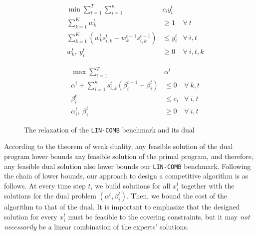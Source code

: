 \begin{figure}
	\begin{mdframed}
		\vspace{-0.2cm}
		\hspace{-0.5cm}
		\begin{minipage}[t]{6.5cm}
			\begin{align*}
					&& \min \sum_{t = 1}^{T} \sum_{i=1}^{n} & c_i y_i^t \\
					&& \sum_{k=1}^{K} w_{k}^{t} & \geq 1  & \forall\ t \\
					&& \sum_{k=1}^{K} \left(w_{k}^{t} s_{i,k}^{t} - w_{k}^{t-1} s_{i,k}^{t-1} \right) &\leq y_i^t  &\forall\ i,t\\
					&& w_{k}^{t},\ y_{i}^{t} & \ge 0 & \forall\ i,t,k
				\end{align*}
		\end{minipage}
		\hspace{0.8cm}
		\begin{minipage}[t]{6cm}
			\begin{align*}
				&& \max \sum_{t=1}^{T} & \alpha^{t} \\
				&& \alpha^{t} + \sum_{i=1}^{n} s_{i,k}^{t} ( \beta_{i}^{t+1} - \beta_{i}^{t})   &\leq 0  &\forall\ k,t\\
				&& \beta_{i}^{t}   &\leq c_{i}  &\forall\ i,t \\
				&& \alpha_{i}^{t},\ \beta_{i}^{t} & \ge 0 & \forall\ i,t
			\end{align*}
		\end{minipage}
	\end{mdframed}
	\caption{The relaxation of the \texttt{LIN-COMB} benchmark and its dual}
	\label{fig:relaxation}
\end{figure}

According to the theorem of weak duality, any feasible solution of the dual program lower bounds any feasible solution of the primal program, and therefore, any feasible dual solution also lower bounds our \texttt{LIN-COMB} benchmark. Following the chain of lower bounds, our approach to design a competitive algorithm is as follows. At every time step $t$, we build solutions for all $x_{i}^{t}$ together with the solutions for the dual problem $(\alpha^{t}, \beta_{i}^{t})$. Then, we bound the cost of the algorithm to that of the dual. It is important to emphasize that the designed solution for every $x_{i}^{t}$ must be feasible to the covering constraints, but it may \emph{not necessarily} be a linear combination of the experts' solutions.

